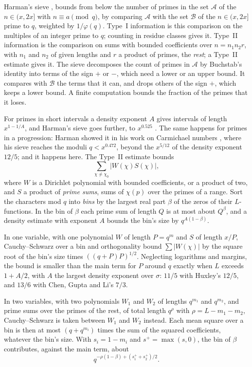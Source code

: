 \documentclass[11pt]{article}
\theoremstyle{definition}
\begin{document}
Harman's sieve \cite{harman83}, \cite[Chapter~3]{harman} bounds from below the number of primes in the set $\mathcal A$
of the $n \in (x, 2x]$ with $n \equiv a \pmod q$, by comparing $\mathcal A$ with the set $\mathcal B$ of the $n \in (x,
2x]$ prime to $q$, weighted by $1/\varphi(q)$. Type~I information is this comparison on the multiples of an integer
prime to $q$; counting in residue classes gives it. Type~II information is the comparison on sums with bounded
coefficients over $n = n_1 n_2 r$, with $n_1$ and $n_2$ of given lengths and $r$ a product of primes, the \emph{rest}; a
Type~II estimate gives it. The sieve decomposes the count of primes in $\mathcal A$ by Buchstab's identity into terms of
the sign $+$ or $-$, which need a lower or an upper bound. It compares with $\mathcal B$ the terms that it can, and
drops others of the sign $+$, which keeps a lower bound. A finite computation bounds the fraction of the primes that it
loses.

For primes in short intervals a density exponent $A$ gives intervals of length $x^{1 - 1/A}$, and Harman's sieve goes
further, to $x^{0.525}$ \cite{bhp}. The same happens for primes in a progression: Harman showed it in his work on
Carmichael numbers \cite{harman05, harman08}, where his sieve reaches the moduli $q < x^{0.472}$, beyond the
$x^{5/12}$ of the density exponent $12/5$; and it happens here. The Type~II estimate bounds
\[
  \sum_{\chi \ne \chi_0} |W(\chi) S(\chi)|,
\]
where $W$ is a Dirichlet polynomial with bounded coefficients, or a product of two, and $S$ a product of \emph{prime
sums}, sums of $\chi(p)$ over the primes of a range. Sort the characters mod $q$ into \emph{bins} by the largest real
part $\beta$ of the zeros of their $L$-functions. In the bin of $\beta$ each prime sum of length $Q$ is at most about
$Q^\beta$, and a density estimate with exponent $A$ bounds the bin's size by $q^{A(1 - \beta)}$.

In one variable, with one polynomial $W$ of length $P = q^m$ and $S$ of length $x/P$, Cauchy--Schwarz over a bin and
orthogonality bound $\sum |W(\chi)|$ by the square root of the bin's size times $((q + P)P)^{1/2}$. Neglecting
logarithms and margins, the bound is smaller than the main term for $P$ around $q$ exactly when $L$ exceeds $1 + A/2$,
with $A$ the largest density exponent over $\sigma$: $11/5$ with Huxley's $12/5$, and $13/6$ with Chen, Gupta and Li's
$7/3$.

In two variables, with two polynomials $W_1$ and $W_2$ of lengths $q^{m_1}$ and $q^{m_2}$, and prime sums over the
primes of the rest, of total length $q^\rho$ with $\rho = L - m_1 - m_2$, Cauchy--Schwarz is taken between $W_1$ and
$W_2$ instead. Each mean square over
a bin is then at most $(q + q^{m_i})$ times the sum of the squared coefficients, whatever the bin's size. With $s_i = 1
- m_i$ and $s^+ = \max(s, 0)$, the bin of $\beta$ contributes, against the main term, about
\[
  q^{-\rho(1 - \beta) + (s_1^+ + s_2^+)/2}.
\]
\end{document}
